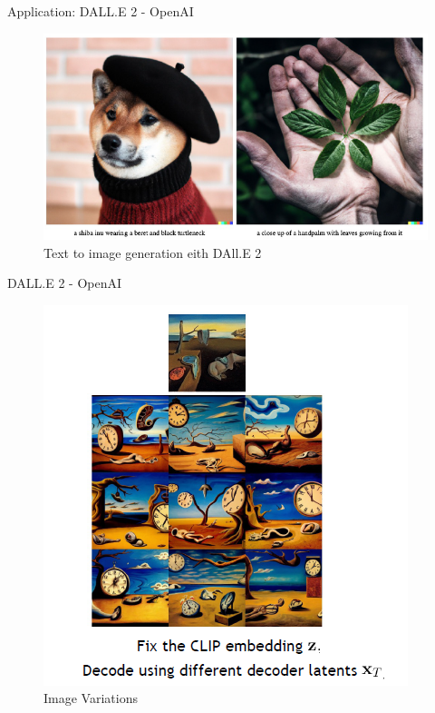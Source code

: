 \begin{frame}{Application: DALL.E 2 - OpenAI}
\begin{figure}
    \centering
    \includegraphics[height=0.8\textheight, width=\textwidth, keepaspectratio]{images/diffusion/diff_results_3.png}
    \caption*{Text to image generation eith DAll.E 2}
\end{figure}
\end{frame}

\begin{frame}{DALL.E 2 - OpenAI}
\begin{figure}
    \centering
    \includegraphics[height=0.8\textheight, width=\textwidth, keepaspectratio]{images/diffusion/diff_results_4.png}
    \caption*{Image Variations}
\end{figure}



\end{frame}


